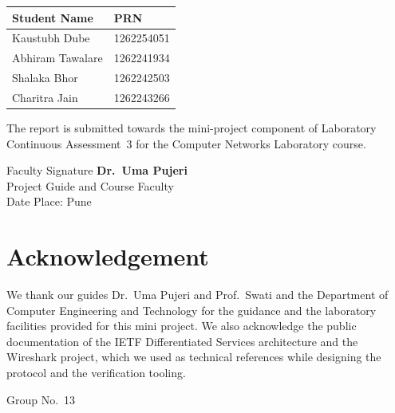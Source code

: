 \documentclass[12pt,a4paper]{article}
\newcommand{\grp}{13}
\begin{document}
\begin{center}
\begin{tabular}{|l|l|}\hline
\textbf{Student Name} & \textbf{PRN}\\\hline
Kaustubh Dube & 1262254051\\\hline
Abhiram Tawalare & 1262241934\\\hline
Shalaka Bhor & 1262242503\\\hline
Charitra Jain & 1262243266\\\hline
\end{tabular}
\end{center}

The report is submitted towards the mini-project component of Laboratory Continuous Assessment~3
for the Computer Networks Laboratory course.

\vspace{3cm}
\noindent Faculty Signature \underline{\hspace{5cm}}\hfill \textbf{Dr.\ Uma Pujeri}\\
\hspace*{\fill}Project Guide and Course Faculty\\[1cm]
Date \underline{\hspace{3cm}} \hfill Place: Pune
\newpage

\setcounter{page}{1}

\section*{Acknowledgement}
We thank our guides Dr.\ Uma Pujeri and Prof.\ Swati and the Department of Computer Engineering and Technology
for the guidance and the laboratory facilities provided for this mini project. We also acknowledge
the public documentation of the IETF Differentiated Services architecture and the Wireshark project,
which we used as technical references while designing the protocol and the verification tooling.

\vfill\hfill Group No.\ \grp
\newpage
\end{document}
